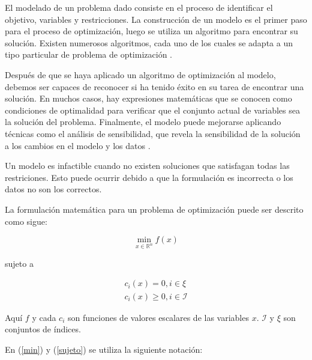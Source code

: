 El modelado de un problema dado consiste en el proceso de identificar el objetivo, variables y restricciones. La construcción de un modelo es el primer paso para el proceso de optimización, luego se utiliza un algoritmo para encontrar su solución. Existen numerosos algoritmos, cada uno de los cuales se adapta a un tipo particular de problema de optimización \citep{Nocedal1999NumericalOptimization}.

Después de que se haya aplicado un algoritmo de optimización al modelo, debemos ser capaces de reconocer si ha tenido éxito en su tarea de encontrar una solución. En muchos casos, hay expresiones matemáticas que se conocen como condiciones de optimalidad para verificar que el conjunto actual de variables sea la solución del problema. Finalmente, el modelo puede mejorarse aplicando técnicas como el análisis de sensibilidad, que revela la sensibilidad de la solución a los cambios en el modelo y los datos \citep{Nocedal1999NumericalOptimization}.

Un modelo es infactible cuando no existen soluciones que satisfagan todas las restriciones. Esto puede ocurrir debido a que la formulación es incorrecta o los datos no son los correctos.



La formulación matemática para un problema de optimización puede ser descrito como sigue:

\begin{equation} \label{min}
\min_{x \in \mathbb{R}^n} f(x) 
\end{equation} 

sujeto a 

\begin{equation} \label{sujeto}
\begin{aligned}
    c_{i}(x) = 0, i \in \xi \\
    c_{i}(x) \geq 0, i \in \mathcal{I}
    \end{aligned}
\end{equation}

Aquí $f$ y cada $c_{i}$ son funciones de valores escalares de las variables $x$. $\mathcal{I}$ y $\xi$ son conjuntos de índices.

En (\ref{min}) y (\ref{sujeto}) se utiliza la siguiente notación:

